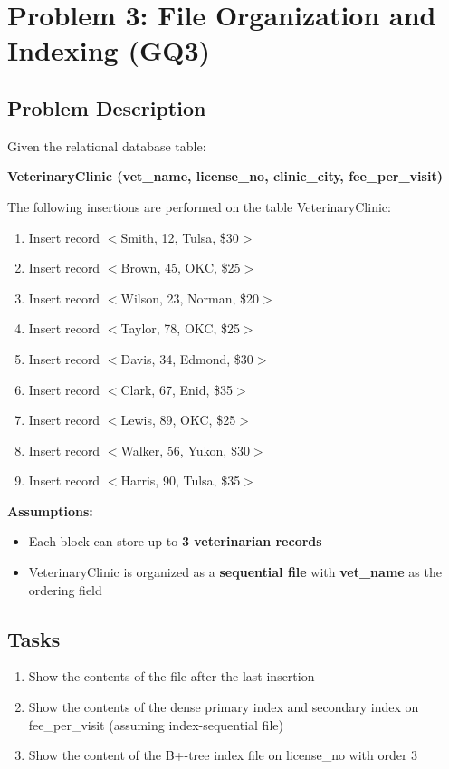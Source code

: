 \documentclass[12pt]{article}
\begin{document}
\setcounter{tocdepth}{2}
\tableofcontents
\newpage

\section{Problem 3: File Organization and Indexing (GQ3)}

\subsection{Problem Description}

Given the relational database table:

\textbf{VeterinaryClinic (vet\_name, license\_no, clinic\_city, fee\_per\_visit)}

The following insertions are performed on the table VeterinaryClinic:

\begin{enumerate}
    \item Insert record $<$Smith, 12, Tulsa, \$30$>$
    \item Insert record $<$Brown, 45, OKC, \$25$>$
    \item Insert record $<$Wilson, 23, Norman, \$20$>$
    \item Insert record $<$Taylor, 78, OKC, \$25$>$
    \item Insert record $<$Davis, 34, Edmond, \$30$>$
    \item Insert record $<$Clark, 67, Enid, \$35$>$
    \item Insert record $<$Lewis, 89, OKC, \$25$>$
    \item Insert record $<$Walker, 56, Yukon, \$30$>$
    \item Insert record $<$Harris, 90, Tulsa, \$35$>$
\end{enumerate}

\textbf{Assumptions:}
\begin{itemize}
    \item Each block can store up to \textbf{3 veterinarian records}
    \item VeterinaryClinic is organized as a \textbf{sequential file} with \textbf{vet\_name} as the ordering field
\end{itemize}

\subsection{Tasks}

\begin{enumerate}
    \item Show the contents of the file after the last insertion
    \item Show the contents of the dense primary index and secondary index on fee\_per\_visit (assuming index-sequential file)
    \item Show the content of the B+-tree index file on license\_no with order 3
\end{enumerate}
\end{document}

